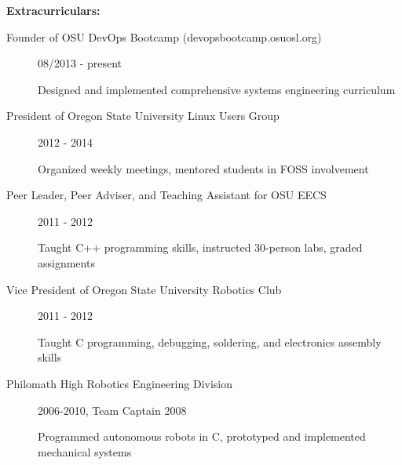 \documentclass[11pt]{article}
\begin{document}
\smallskip
\hrulefill
\bigskip

{\Large \bf Extracurriculars:}
\begin{description}
    \item[Founder of OSU DevOps Bootcamp (devopsbootcamp.osuosl.org)]
        \hfill 08/2013 - present
        
        Designed and implemented comprehensive systems engineering curriculum

    \item[President of Oregon State University Linux Users Group]
        \hfill 2012 - 2014

        Organized weekly meetings, mentored students in FOSS involvement

    \item[Peer Leader, Peer Adviser, and Teaching Assistant for OSU EECS]
        \hfill 2011 - 2012

        Taught C++ programming skills, instructed 30-person labs, graded
        assignments

    \item[Vice President of Oregon State University Robotics Club]
        \hfill 2011 - 2012

        Taught C programming, debugging, soldering, and electronics assembly skills

    \item[Philomath High Robotics Engineering Division]
        \hfill 2006-2010, Team Captain 2008

        Programmed autonomous robots in C, prototyped and implemented
        mechanical systems

\end{description}
\end{document}
